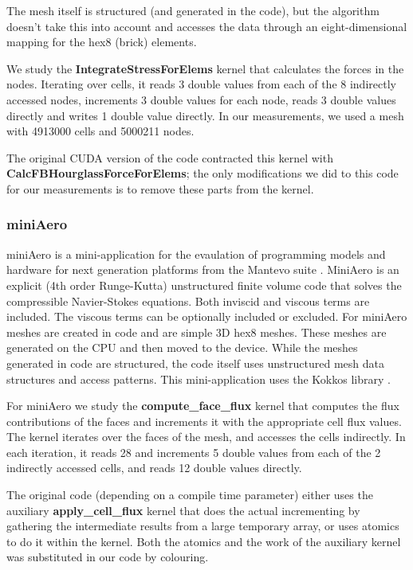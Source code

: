 The mesh itself is structured (and generated in the code), but
the algorithm doesn't take this into account and accesses the data through an
eight-dimensional mapping for the hex8 (brick) elements.

We study the \textbf{IntegrateStressForElems} kernel that calculates the
forces in the nodes. Iterating over cells, it reads 3 double values
from each of the 8 indirectly accessed nodes, increments 3 double values for
each node, reads 3 double values directly and writes 1 double value directly. In
our measurements, we used a mesh with \num{4913000} cells and \num{5000211}
nodes.

The original CUDA version of the code contracted this kernel with
\textbf{CalcFBHourglassForceForElems}; the only modifications we did to this
code for our measurements is to remove these parts from the kernel.

\subsubsection{miniAero}\label{sec:mini-aero-summary}

miniAero \cite{miniaero} is a mini-application for the evaulation of programming
models and hardware for next generation platforms from the Mantevo suite
\cite{heroux2009improving}. MiniAero is an explicit (4th order
Runge-Kutta) unstructured finite volume code that solves the compressible
Navier-Stokes equations. Both inviscid and viscous terms are included. The
viscous terms can be optionally included or excluded. For miniAero meshes are
created in code and are simple 3D hex8 meshes. These meshes are generated on the
CPU and then moved to the device. While the meshes generated in code are
structured, the code itself uses unstructured mesh data structures and access
patterns. This mini-application uses the Kokkos library
\cite{CarterEdwards20143202}.

For miniAero we study the \textbf{compute\_face\_flux} kernel that computes the
flux contributions of the faces and increments it with the appropriate cell flux
values. The kernel iterates over the faces of the mesh, and accesses the cells
indirectly. In each iteration, it reads 28 and increments 5 double values from
each of the 2 indirectly accessed cells, and reads 12 double values directly.

The original code (depending on a compile time parameter) either uses the
auxiliary \textbf{apply\_cell\_flux} kernel that does the actual incrementing by
gathering the intermediate results from a large temporary array, or uses atomics
to do it within the kernel. Both the atomics and the work of the auxiliary
kernel was substituted in our code by colouring.

